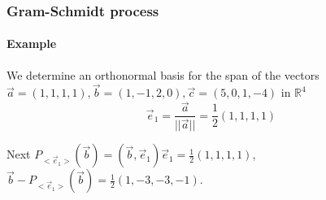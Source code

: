 \documentclass{article}
\begin{document}
		\subsubsection{Gram-Schmidt process}
			\paragraph{Example}
			We determine an orthonormal basis for the span of the vectors $\vec{a} = (1,1,1,1), \vec{b}=(1,-1,2,0),\vec{c}=(5,0,1,-4)$ in $\mathbb{R}^4$
			\begin{equation*}
				\vec{e}_1 = \frac{\vec{a}}{||\vec{a}||} = \frac{1}{2}(1,1,1,1)
			\end{equation*}
			
			Next $P_{<\vec{e}_1>}(\vec{b}) = (\vec{b}, \vec{e}_1)\vec{e}_1 = \frac{1}{2}(1,1,1,1)$, $\vec{b} - P_{<\vec{e}_1>}(\vec{b}) = \frac{1}{2}(1,-3,-3,-1)$.
\end{document}
